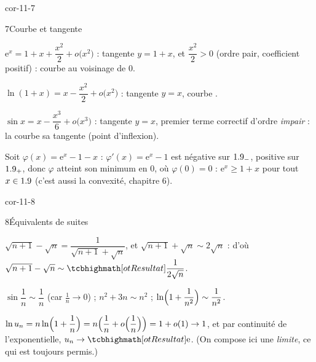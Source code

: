 \begin{blocLivre}{cor-11-7}
\begin{corrige}{7}{Courbe et tangente}
\begin{questions}
  \item $\mathrm{e}^{x}=1+x+\dfrac{x^{2}}{2}+o\bigl(x^{2}\bigr)$ : tangente
    $y=1+x$, et $\dfrac{x^{2}}{2}>0$ (ordre pair, coefficient positif) :
    courbe  au voisinage de $0$.
  \item $\ln(1+x)=x-\dfrac{x^{2}}{2}+o\bigl(x^{2}\bigr)$ : tangente $y=x$,
    courbe .
  \item $\sin x=x-\dfrac{x^{3}}{6}+o\bigl(x^{3}\bigr)$ : tangente $y=x$,
    premier terme correctif d'ordre \emph{impair} : la courbe
     sa tangente (point d'inflexion).
\end{questions}
Soit $\varphi(x)=\mathrm{e}^{x}-1-x$ : $\varphi'(x)=\mathrm{e}^{x}-1$ est
négative sur $1.9_{-}$, positive sur $1.9_{+}$, donc $\varphi$ atteint son
minimum en $0$, où $\varphi(0)=0$ : $\mathrm{e}^{x}\geqslant1+x$ pour tout
$x\in1.9$ (c'est aussi la convexité, chapitre 6).
\end{corrige}
\end{blocLivre}

\begin{blocLivre}{cor-11-8}
\begin{corrige}{8}{Équivalents de suites}
\begin{questions}
  \item $\sqrt{n+1}-\sqrt{n}=\dfrac{1}{\sqrt{n+1}+\sqrt{n}}$, et
    $\sqrt{n+1}+\sqrt{n}\sim2\sqrt{n}$ :
    d'où $\sqrt{n+1}-\sqrt{n}\sim\res{\dfrac{1}{2\sqrt{n}}}$.
  \item $\sin\dfrac1n\sim\dfrac1n$ (car $\tfrac1n\to0$) ;
    $n^{2}+3n\sim n^{2}$ ;
    $\ln\Bigl(1+\dfrac{1}{n^{2}}\Bigr)\sim\dfrac{1}{n^{2}}$.
  \item $\ln u_n=n\ln\Bigl(1+\dfrac1n\Bigr)
    =n\Bigl(\dfrac1n+o\Bigl(\dfrac1n\Bigr)\Bigr)=1+o(1)\to1$, et par
    continuité de l'exponentielle, $u_n\to\res{\mathrm{e}}$. (On compose ici
    une \emph{limite}, ce qui est toujours permis.)
\end{questions}
\end{corrige}
\end{blocLivre}

